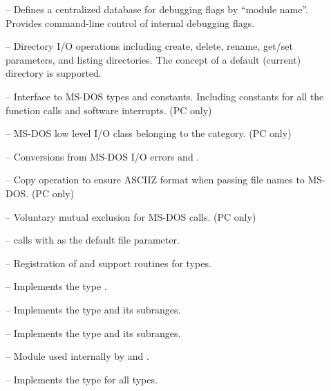 \begin{description}
\item[] --
    Defines a centralized database for debugging flags by ``module name''.
    Provides command-line control of internal debugging flags.

\item[] --
    Directory I/O operations including create, delete, rename, get/set
    parameters, and listing directories.  The concept of a default (current)
    directory is supported.

\item[] --
    Interface to MS-DOS types and constants.  Including constants for
    all the function calls and software interrupts. (PC only)

\item[] --
    MS-DOS low level I/O class belonging to the  category.
    (PC only)

\item[] --
    Conversions from MS-DOS I/O errors and .

\item[] --
    Copy operation to ensure ASCIIZ format when passing file names to MS-DOS.
    (PC only)

\item[] --
    Voluntary mutual exclusion for MS-DOS calls.
    (PC only)

\item[] --
     calls with  as the default file
    parameter.

\item[] --
    Registration of and support routines for  types.

\item[] --
    Implements the  type .

\item[] --
    Implements the  type  and its subranges.

\item[] --
    Implements the  type  and its subranges.

\item[] --
    Module used internally by  and .

\item[] --
    Implements the  type for all  types.


\end{description}
